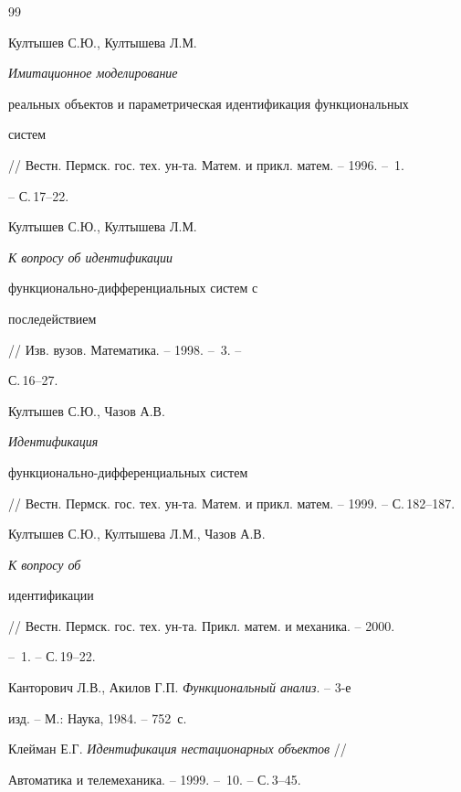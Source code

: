 \begin{thebibliography}{99}







Култышев С.Ю., Култышева Л.М. {\em Имитационное моделирование


реальных объектов и параметрическая идентификация функциональных


систем} // Вестн. Пермск. гос. тех. ун-та. Матем. и прикл. матем. -- 1996. -- \No\,1.


-- С.\,17--22.




Култышев С.Ю., Култышева Л.М. {\em К вопросу об идентификации


функционально-дифференциальных систем с


последействием} // Изв. вузов. Математика. -- 1998. -- \No\,3. --


С.\,16--27.




Култышев С.Ю., Чазов А.В. {\em Идентификация


функционально-дифференциальных систем}


// Вестн. Пермск. гос. тех. ун-та. Матем. и прикл. матем. -- 1999. -- С.\,182--187.




Култышев С.Ю., Култышева Л.М., Чазов А.В. {\em К вопросу об


идентификации} // Вестн. Пермск. гос. тех. ун-та. Прикл. матем. и механика. -- 2000.


-- \No\,1. -- С.\,19--22.




Канторович Л.В., Акилов Г.П. {\em Функциональный анализ}. -- 3-е


изд. -- М.: Наука, 1984. -- 752~с.




Клейман Е.Г. {\em Идентификация нестационарных объектов} //


Автоматика и телемеханика. -- 1999. -- \No\,10. -- С.\,3--45.





\end{thebibliography}





\vskip 2cm












\label{end}





